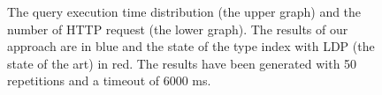 \begin{figure}[ht]
    
    \caption{The query execution time distribution (the upper graph) and the number of HTTP request (the lower graph).
    The results of our approach are in blue and the state of the type index with LDP (the state of the art) in red.
    The results have been generated with 50 repetitions and a timeout of 6000 ms. 
    }
    \label{fig:result}
\end{figure}
  